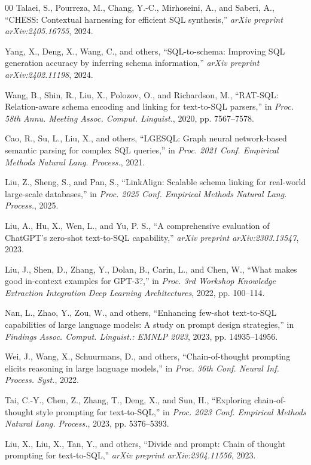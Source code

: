 \documentclass[conference]{IEEEtran}
\begin{document}
\begin{thebibliography}{00}
 Talaei, S., Pourreza, M., Chang, Y.-C., Mirhoseini, A., and Saberi, A., ``CHESS: Contextual harnessing for efficient SQL synthesis,'' \textit{arXiv preprint arXiv:2405.16755}, 2024.

 Yang, X., Deng, X., Wang, C., and others, ``SQL-to-schema: Improving SQL generation accuracy by inferring schema information,'' \textit{arXiv preprint arXiv:2402.11198}, 2024.

 Wang, B., Shin, R., Liu, X., Polozov, O., and Richardson, M., ``RAT-SQL: Relation-aware schema encoding and linking for text-to-SQL parsers,'' in \textit{Proc. 58th Annu. Meeting Assoc. Comput. Linguist.}, 2020, pp. 7567--7578.

 Cao, R., Su, L., Liu, X., and others, ``LGESQL: Graph neural network-based semantic parsing for complex SQL queries,'' in \textit{Proc. 2021 Conf. Empirical Methods Natural Lang. Process.}, 2021.

 Liu, Z., Sheng, S., and Pan, S., ``LinkAlign: Scalable schema linking for real-world large-scale databases,'' in \textit{Proc. 2025 Conf. Empirical Methods Natural Lang. Process.}, 2025.

 Liu, A., Hu, X., Wen, L., and Yu, P. S., ``A comprehensive evaluation of ChatGPT's zero-shot text-to-SQL capability,'' \textit{arXiv preprint arXiv:2303.13547}, 2023.

 Liu, J., Shen, D., Zhang, Y., Dolan, B., Carin, L., and Chen, W., ``What makes good in-context examples for GPT-3?,'' in \textit{Proc. 3rd Workshop Knowledge Extraction Integration Deep Learning Architectures}, 2022, pp. 100--114.

 Nan, L., Zhao, Y., Zou, W., and others, ``Enhancing few-shot text-to-SQL capabilities of large language models: A study on prompt design strategies,'' in \textit{Findings Assoc. Comput. Linguist.: EMNLP 2023}, 2023, pp. 14935--14956.

 Wei, J., Wang, X., Schuurmans, D., and others, ``Chain-of-thought prompting elicits reasoning in large language models,'' in \textit{Proc. 36th Conf. Neural Inf. Process. Syst.}, 2022.

 Tai, C.-Y., Chen, Z., Zhang, T., Deng, X., and Sun, H., ``Exploring chain-of-thought style prompting for text-to-SQL,'' in \textit{Proc. 2023 Conf. Empirical Methods Natural Lang. Process.}, 2023, pp. 5376--5393.

 Liu, X., Liu, X., Tan, Y., and others, ``Divide and prompt: Chain of thought prompting for text-to-SQL,'' \textit{arXiv preprint arXiv:2304.11556}, 2023.


\end{thebibliography}
\end{document}
